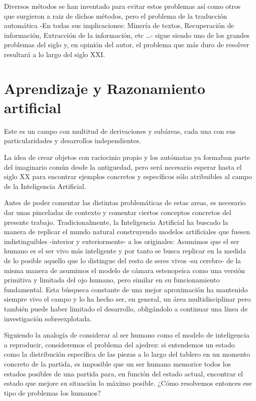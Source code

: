 Diversos métodos se han inventado para evitar estos problemas así como otros que
surgieron a raiz de dichos métodos, pero el problema de la traducción automática
-En todas sus implicaciones: Minería de textos, Recuperación de información,
Extracción de la información, etc \ldots- sigue siendo uno de los grandes
problemas del siglo y, en opinión del autor, el problema que más duro de
resolver resultará a lo largo del siglo XXI.

\section{Aprendizaje y Razonamiento artificial}

Este es un campo con multitud de derivaciones y subáreas, cada una con sus
particularidades y desarrollos independientes.

La idea de crear objetos con raciocinio propio y los autómatas ya
formaban parte del imaginario común desde la antiguedad, pero será necesario
esperar hasta el siglo XX para encontrar ejemplos concretos y específicos sólo
atribuibles al campo de la Inteligencia Artificial.

Antes de poder comentar las distintas problemáticas de estas areas, es necesario
dar unas pinceladas de contexto y comentar ciertos conceptos concretos del
presente trabajo.
Tradicionalmente, la Inteligencia Artificial ha buscado la
manera de replicar el mundo natural construyendo modelos artificiales que fuesen
indistinguibles -interior y exteriormente- a los originales: Asumimos que el ser
humano es el ser vivo más inteligente y por tanto se busca replicar en la medida
de lo posible aquello que lo distingue del resto de seres vivos -su cerebro- de
la misma manera de asumimos el modelo de cámara estenopeica como una versión
primitiva y limitada del ojo humano, pero similar en su funcionamiento
fundamental. Esta búsqueca constante de una mejor aproximación ha mantenido
siempre vivo el campo y lo ha hecho ser, en general, un área multidisciplinar
pero también puede haber limitado el desarrollo, obligándolo a continuar una
línea de investigación sobreexplotada.

Siguiendo la analogía de considerar al ser humano como el modelo de inteligencia
a reproducir, consideremos el problema del ajedrez: si entendemos un estado como
la distribución específica de las piezas a lo largo del tablero en un momento
concreto de la partida, es imposible que un ser humano memorice todos los
estados posibles de una partida para, en función del estado actual, encontrar el
estado que mejore su situación lo máximo posible. ¿Cómo resolvemos entonces ese
tipo de problemas los humanos? 

